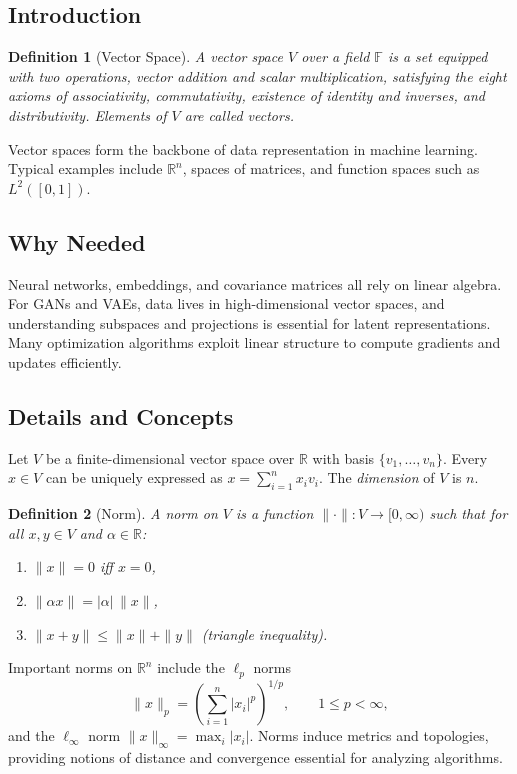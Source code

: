 \documentclass[11pt]{book}
\newtheorem{definition}{Definition}[chapter]
\begin{document}
\subsection{Introduction}
\begin{definition}[Vector Space]
A \emph{vector space} $V$ over a field $\mathbb{F}$ is a set equipped with two operations, vector addition and scalar multiplication, satisfying the eight axioms of associativity, commutativity, existence of identity and inverses, and distributivity. Elements of $V$ are called \emph{vectors}.
\end{definition}
Vector spaces form the backbone of data representation in machine learning. Typical examples include $\mathbb{R}^n$, spaces of matrices, and function spaces such as $L^2([0,1])$.

\subsection{Why Needed}
Neural networks, embeddings, and covariance matrices all rely on linear algebra. For GANs and VAEs, data lives in high-dimensional vector spaces, and understanding subspaces and projections is essential for latent representations. Many optimization algorithms exploit linear structure to compute gradients and updates efficiently.

\subsection{Details and Concepts}
Let $V$ be a finite-dimensional vector space over $\mathbb{R}$ with basis $\{v_1,\dots,v_n\}$. Every $x\in V$ can be uniquely expressed as $x=\sum_{i=1}^n x_i v_i$. The \emph{dimension} of $V$ is $n$.

\begin{definition}[Norm]
A \emph{norm} on $V$ is a function $\|\cdot\|:V\to[0,\infty)$ such that for all $x,y\in V$ and $\alpha\in\mathbb{R}$:
\begin{enumerate}
    \item $\|x\|=0$ iff $x=0$,
    \item $\|\alpha x\|=|\alpha|\,\|x\|$,
    \item $\|x+y\|\le \|x\|+\|y\|$ (triangle inequality).
\end{enumerate}
\end{definition}
Important norms on $\mathbb{R}^n$ include the $\ell_p$ norms
\begin{equation}
\|x\|_p = \left(\sum_{i=1}^n |x_i|^p\right)^{1/p},\qquad 1\le p<\infty,
\end{equation}
and the $\ell_\infty$ norm $\|x\|_\infty=\max_i|x_i|$. Norms induce metrics and topologies, providing notions of distance and convergence essential for analyzing algorithms.
\end{document}
